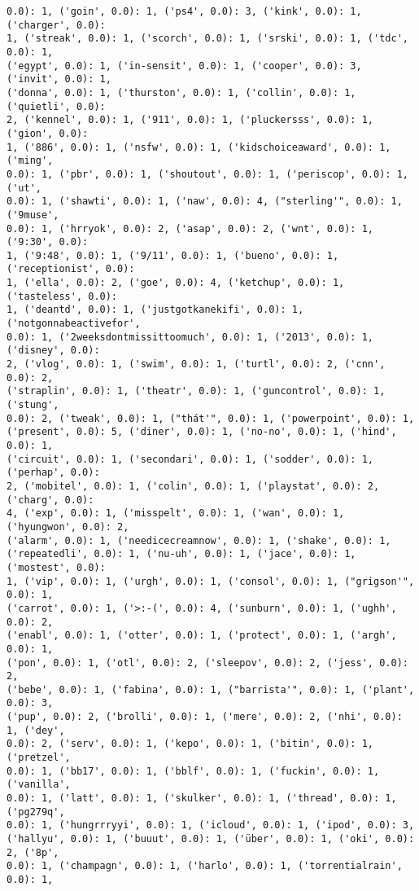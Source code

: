 \documentclass[11pt]{article}
\begin{document}
\begin{Verbatim}[commandchars=\\\{\}]
0.0): 1, ('goin', 0.0): 1, ('ps4', 0.0): 3, ('kink', 0.0): 1, ('charger', 0.0):
1, ('streak', 0.0): 1, ('scorch', 0.0): 1, ('srski', 0.0): 1, ('tdc', 0.0): 1,
('egypt', 0.0): 1, ('in-sensit', 0.0): 1, ('cooper', 0.0): 3, ('invit', 0.0): 1,
('donna', 0.0): 1, ('thurston', 0.0): 1, ('collin', 0.0): 1, ('quietli', 0.0):
2, ('kennel', 0.0): 1, ('911', 0.0): 1, ('pluckersss', 0.0): 1, ('gion', 0.0):
1, ('886', 0.0): 1, ('nsfw', 0.0): 1, ('kidschoiceaward', 0.0): 1, ('ming',
0.0): 1, ('pbr', 0.0): 1, ('shoutout', 0.0): 1, ('periscop', 0.0): 1, ('ut',
0.0): 1, ('shawti', 0.0): 1, ('naw', 0.0): 4, ("sterling'", 0.0): 1, ('9muse',
0.0): 1, ('hrryok', 0.0): 2, ('asap', 0.0): 2, ('wnt', 0.0): 1, ('9:30', 0.0):
1, ('9:48', 0.0): 1, ('9/11', 0.0): 1, ('bueno', 0.0): 1, ('receptionist', 0.0):
1, ('ella', 0.0): 2, ('goe', 0.0): 4, ('ketchup', 0.0): 1, ('tasteless', 0.0):
1, ('deantd', 0.0): 1, ('justgotkanekifi', 0.0): 1, ('notgonnabeactivefor',
0.0): 1, ('2weeksdontmissittoomuch', 0.0): 1, ('2013', 0.0): 1, ('disney', 0.0):
2, ('vlog', 0.0): 1, ('swim', 0.0): 1, ('turtl', 0.0): 2, ('cnn', 0.0): 2,
('straplin', 0.0): 1, ('theatr', 0.0): 1, ('guncontrol', 0.0): 1, ('stung',
0.0): 2, ('tweak', 0.0): 1, ("thát'", 0.0): 1, ('powerpoint', 0.0): 1,
('present', 0.0): 5, ('diner', 0.0): 1, ('no-no', 0.0): 1, ('hind', 0.0): 1,
('circuit', 0.0): 1, ('secondari', 0.0): 1, ('sodder', 0.0): 1, ('perhap', 0.0):
2, ('mobitel', 0.0): 1, ('colin', 0.0): 1, ('playstat', 0.0): 2, ('charg', 0.0):
4, ('exp', 0.0): 1, ('misspelt', 0.0): 1, ('wan', 0.0): 1, ('hyungwon', 0.0): 2,
('alarm', 0.0): 1, ('needicecreamnow', 0.0): 1, ('shake', 0.0): 1,
('repeatedli', 0.0): 1, ('nu-uh', 0.0): 1, ('jace', 0.0): 1, ('mostest', 0.0):
1, ('vip', 0.0): 1, ('urgh', 0.0): 1, ('consol', 0.0): 1, ("grigson'", 0.0): 1,
('carrot', 0.0): 1, ('>:-(', 0.0): 4, ('sunburn', 0.0): 1, ('ughh', 0.0): 2,
('enabl', 0.0): 1, ('otter', 0.0): 1, ('protect', 0.0): 1, ('argh', 0.0): 1,
('pon', 0.0): 1, ('otl', 0.0): 2, ('sleepov', 0.0): 2, ('jess', 0.0): 2,
('bebe', 0.0): 1, ('fabina', 0.0): 1, ("barrista'", 0.0): 1, ('plant', 0.0): 3,
('pup', 0.0): 2, ('brolli', 0.0): 1, ('mere', 0.0): 2, ('nhi', 0.0): 1, ('dey',
0.0): 2, ('serv', 0.0): 1, ('kepo', 0.0): 1, ('bitin', 0.0): 1, ('pretzel',
0.0): 1, ('bb17', 0.0): 1, ('bblf', 0.0): 1, ('fuckin', 0.0): 1, ('vanilla',
0.0): 1, ('latt', 0.0): 1, ('skulker', 0.0): 1, ('thread', 0.0): 1, ('pg279q',
0.0): 1, ('hungrrryyi', 0.0): 1, ('icloud', 0.0): 1, ('ipod', 0.0): 3,
('hallyu', 0.0): 1, ('buuut', 0.0): 1, ('über', 0.0): 1, ('oki', 0.0): 2, ('8p',
0.0): 1, ('champagn', 0.0): 1, ('harlo', 0.0): 1, ('torrentialrain', 0.0): 1,

\end{Verbatim}
\end{document}
